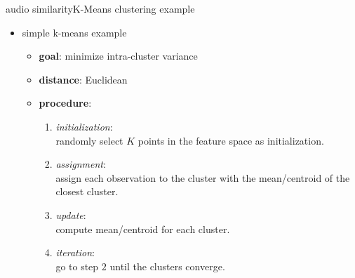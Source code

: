         \begin{frame}{audio similarity}{K-Means clustering example}
            \begin{itemize}
                \item   simple k-means example
                    \begin{itemize}
                        \item   \textbf{goal}: minimize intra-cluster variance
                        \item   \textbf{distance}: Euclidean
                        \item   \textbf{procedure}:
                            \begin{enumerate}
                                \item	\textit{initialization}:\\ randomly select $K$ points in the feature space as initialization.
                                \item<2->	\textit{assignment}:\\ assign each observation to the cluster with the mean/centroid of the closest cluster.
                                \item<3->	\textit{update}:\\ compute mean/centroid for each cluster.
                                \item<4->	\textit{iteration}:\\ go to step $2$ until the clusters converge.
                            \end{enumerate}
                    \end{itemize}
            \end{itemize}
        \end{frame}
